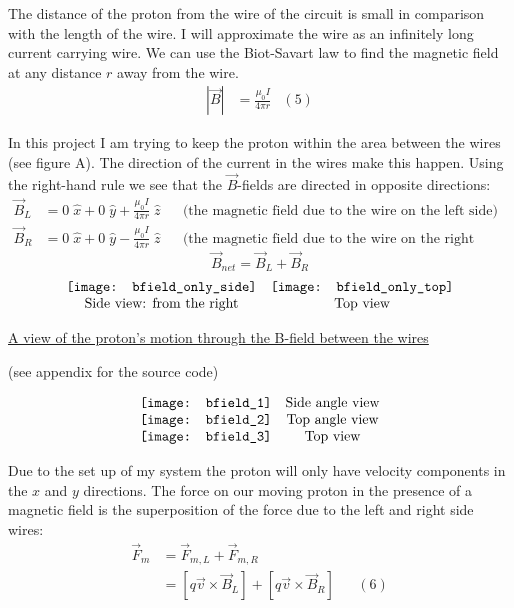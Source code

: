 \documentclass[11pt]{article}
\begin{document}
\vspace{.2in}

\noindent The distance of the proton from the wire of the circuit is small in comparison with the length of the wire. I will approximate the wire as an infinitely long current carrying wire. We can use the Biot-Savart law to find the magnetic field at any distance $r$ away from the wire. 
\begin{align*}
\left|\vec{B}\right|&=\frac{\mu_0I}{4\pi r}&(5)
\end{align*}

\vspace{.2in}

\noindent In this project I am trying to keep the proton within the area between the wires (see figure A). The direction of the current in the wires make this happen. Using the right-hand rule we see that the $\vec{B}$-fields are directed in opposite directions:
\begin{align*}
\vec{B}_L&=0\;\hat{x}+0\;\hat{y}+\frac{\mu_0I}{4\pi r}\;\hat{z}&&\text{(the magnetic field due to the wire on the left side)}\\\vec{B}_R&=0\;\hat{x}+0\;\hat{y}-\frac{\mu_0I}{4\pi r}\;\hat{z}&&\text{(the magnetic field due to the wire on the right side)}
\end{align*}
\[
\vec{B}_{net}=\vec{B}_L+\vec{B}_R
\]
\[
\begin{array}{c c}
\texttt{[image: bfield\_only\_side]}	&	\texttt{[image: bfield\_only\_top]}\\
\text{Side view: from the right}								&	\text{Top view}
\end{array} 
\]


\newpage

\begin{center}
\underline{A view of the proton's motion through the B-field between the wires}

(see appendix for the source code)
\end{center}
\[
\begin{array}{c c}
\texttt{[image: bfield\_1]}	& 	\text{Side angle view}	\\
\texttt{[image: bfield\_2]}	& 	\text{Top angle view}	\\
\texttt{[image: bfield\_3]}	&	\text{Top view}			
\end{array}
\]

\newpage

\noindent Due to the set up of my system the proton will only have velocity components in the $x$ and $y$ directions. The force on our moving proton in the presence of a magnetic field is the superposition of the force due to the left and right side wires:
\begin{align*}
\vec{F}_m&=\vec{F}_{m,L}+\vec{F}_{m,R}\\&=\left[q\vec{v}\times\vec{B}_L\right]+\left[q\vec{v}\times\vec{B}_R\right]&&(6)
\end{align*}
\end{document}
